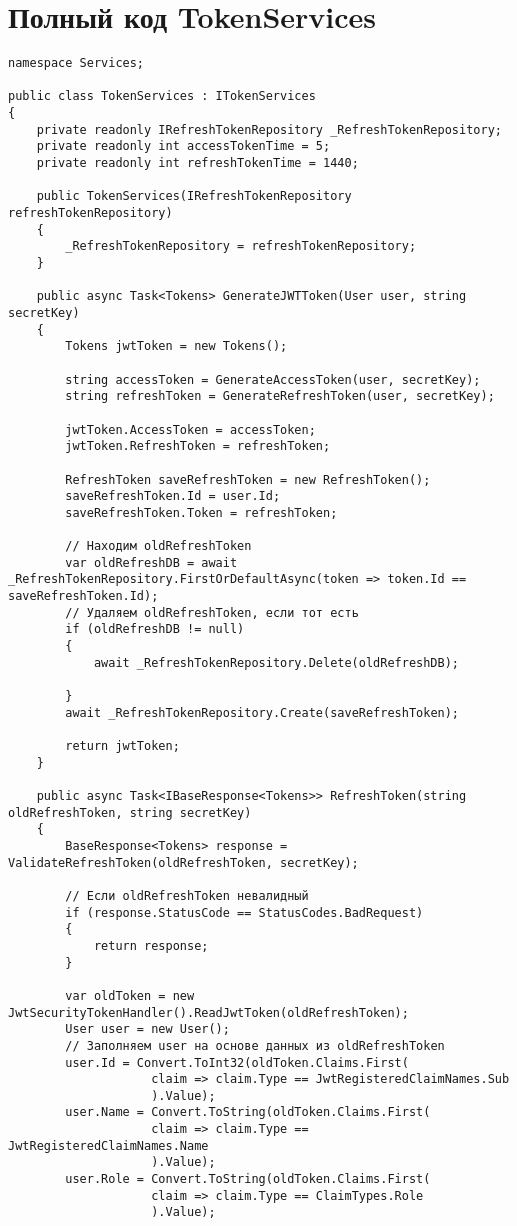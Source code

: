\section{Полный код TokenServices}\label{app:TokenServices}
\begin{verbatim}
namespace Services;

public class TokenServices : ITokenServices
{
    private readonly IRefreshTokenRepository _RefreshTokenRepository;
    private readonly int accessTokenTime = 5;
    private readonly int refreshTokenTime = 1440;

    public TokenServices(IRefreshTokenRepository refreshTokenRepository)
    {
        _RefreshTokenRepository = refreshTokenRepository;
    }

    public async Task<Tokens> GenerateJWTToken(User user, string secretKey)
    {
        Tokens jwtToken = new Tokens();

        string accessToken = GenerateAccessToken(user, secretKey);
        string refreshToken = GenerateRefreshToken(user, secretKey);

        jwtToken.AccessToken = accessToken;
        jwtToken.RefreshToken = refreshToken;

        RefreshToken saveRefreshToken = new RefreshToken();
        saveRefreshToken.Id = user.Id;
        saveRefreshToken.Token = refreshToken;

        // Находим oldRefreshToken
        var oldRefreshDB = await _RefreshTokenRepository.FirstOrDefaultAsync(token => token.Id == saveRefreshToken.Id);
        // Удаляем oldRefreshToken, если тот есть
        if (oldRefreshDB != null)
        {
            await _RefreshTokenRepository.Delete(oldRefreshDB);

        }
        await _RefreshTokenRepository.Create(saveRefreshToken);

        return jwtToken;
    }

    public async Task<IBaseResponse<Tokens>> RefreshToken(string oldRefreshToken, string secretKey)
    {
        BaseResponse<Tokens> response = ValidateRefreshToken(oldRefreshToken, secretKey);

        // Если oldRefreshToken невалидный
        if (response.StatusCode == StatusCodes.BadRequest)
        {
            return response;
        }

        var oldToken = new JwtSecurityTokenHandler().ReadJwtToken(oldRefreshToken);
        User user = new User();
        // Заполняем user на основе данных из oldRefreshToken
        user.Id = Convert.ToInt32(oldToken.Claims.First(
                    claim => claim.Type == JwtRegisteredClaimNames.Sub
                    ).Value);
        user.Name = Convert.ToString(oldToken.Claims.First(
                    claim => claim.Type == JwtRegisteredClaimNames.Name
                    ).Value);
        user.Role = Convert.ToString(oldToken.Claims.First(
                    claim => claim.Type == ClaimTypes.Role
                    ).Value);


\end{verbatim}
